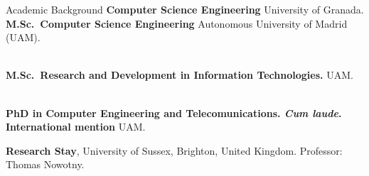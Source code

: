 \begin{rubric}{Academic Background}
\entry*[2014 -- 2018]%
	\textbf{Computer Science Engineering} University of Granada.
%
\entry*[2018 -- 2019]%
	\textbf{M.Sc.~Computer Science Engineering} Autonomous University of Madrid (UAM).\par
\\\vspace{-35pt}
\entry*[2018 -- 2019]%
	\textbf{M.Sc.~Research and Development in Information Technologies.} UAM.\par
\\\vspace{-30pt}
\entry*[2020 -- 2024]%
	\textbf{PhD in Computer Engineering and Telecomunications. \textit{Cum laude}. International mention} UAM.\par
    
 \textbf{Research Stay}, University of Sussex, Brighton, United Kingdom. Professor: Thomas Nowotny.

\end{rubric}